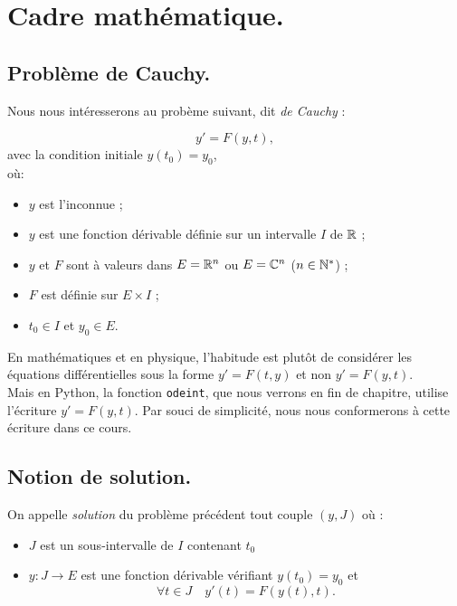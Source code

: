 \section{Cadre mathématique.}

\subsection{Problème de Cauchy.}

Nous nous intéresserons au probème suivant, dit \emph{de Cauchy} :

\begin{equation}
  \label{eq:o1}
  y' = F(y,t),
\end{equation}
avec la condition initiale $y(t_{0})=y_{0}$,\\

où:
\begin{itemize}
\item $y$ est l'inconnue ;
\item $y$ est une fonction dérivable définie sur un intervalle $I$ de $\mathbb{R}$ ;
\item $y$ et $F$ sont à valeurs dans $E = \mathbb{R}^{n}$ ou $E=\mathbb{C}^{n}$ ($n\in\mathbb{N}^{*}$) ;
\item $F$ est définie sur $E\times I$ ;
\item $t_{0}\in I$ et $y_{0}\in E$.
\end{itemize}


\begin{rem}
En mathématiques et en physique, l'habitude est plutôt de considérer les équations 
différentielles sous la forme $y'=F(t,y)$ et non $y'=F(y,t)$.\\
Mais en Python, la fonction \texttt{odeint}, que nous verrons en fin de chapitre, 
utilise l'écriture $y'=F(y,t)$. Par souci de simplicité, nous nous conformerons à cette 
écriture dans ce cours.
\end{rem}


\subsection{Notion de solution.}

On appelle \emph{solution} du problème précédent tout couple $(y,J)$ où :
\begin{itemize}
\item $J$ est un sous-intervalle de $I$ contenant $t_{0}$
\item $y : J\to E$ est une fonction dérivable vérifiant $y(t_{0})=y_{0}$ et
  \begin{equation*}
    \forall t \in J\quad y'(t)=F(y(t),t).
  \end{equation*}
\end{itemize}


